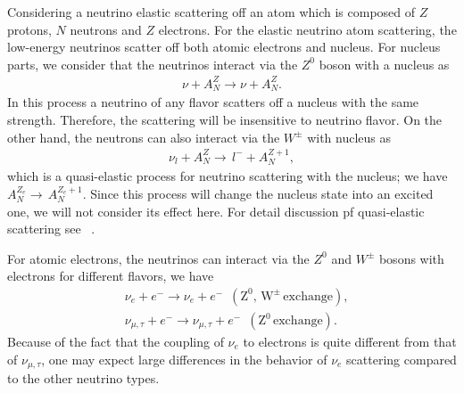 Considering a neutrino elastic scattering off an atom which is composed of $Z$ protons, $N$ neutrons and $Z$ electrons. For the elastic neutrino atom scattering, the low-energy neutrinos scatter off both atomic electrons and nucleus. For nucleus parts, we consider that the neutrinos interact via the $Z^0$ boson with a nucleus as
\begin{align}
\nu+A^{Z}_N\longrightarrow\nu+A^{Z}_N.
\end{align}
In this process a neutrino of any flavor scatters off a nucleus with the same strength. Therefore, the scattering will be insensitive to neutrino flavor. On the other hand, the neutrons can also interact via the $W^\pm$ with nucleus as 
\begin{align}
\nu_l+A^{Z}_N\longrightarrow\,l^-+A^{{Z}+1}_N,
\end{align}
which is a quasi-elastic process for neutrino scattering with the nucleus; we have $A^{Z_e}_N\rightarrow\,A^{{Z_e}+1}_N$. Since this process will change the nucleus state into an excited one, we will not consider its effect here. For detail discussion pf quasi-elastic scattering see ~\cite{SajjadAthar:2022pjt}.

For atomic electrons, the neutrinos can interact via the $Z^0$ and $W^\pm$ bosons with electrons for different flavors, we have
\begin{align}
&\nu_e+e^-\longrightarrow\nu_e+e^-\,\,\,(\mathrm{Z^0,\,W^\pm\,exchange}),\\
&\nu_{\mu,\tau}+e^-\longrightarrow\nu_{\mu,\tau}+e^-\,\,\,(\mathrm{Z^0\,exchange}).
\end{align}
Because of the fact that the coupling of $\nu_e$ to electrons is quite different from that of $\nu_{\mu,\tau}$, one may expect large differences in the behavior of $\nu_e$ scattering compared to the other neutrino types.


